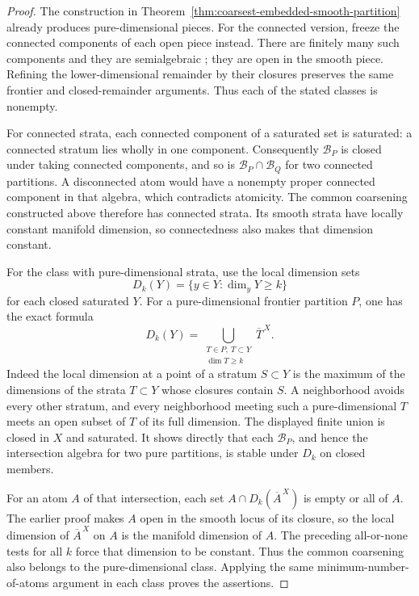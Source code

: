 \begin{proof}
The construction in
Theorem~\ref{thm:coarsest-embedded-smooth-partition} already produces
pure-dimensional pieces.  For the connected version, freeze the
connected components of each open piece instead.  There are finitely
many such components and they are semialgebraic
\cite[Proposition~1.6, p.~5]{Coste2007}; they are open in the smooth
piece.  Refining the lower-dimensional remainder by their closures
preserves the same frontier and closed-remainder arguments.
Thus each of the stated classes is nonempty.

For connected strata, each connected component of a saturated set
is saturated: a connected stratum lies wholly in one component.
Consequently $\mathcal B_P$ is closed under taking connected
components, and so is $\mathcal B_P\cap\mathcal B_Q$ for two
connected partitions.  A disconnected atom would have a nonempty
proper connected component in that algebra, which contradicts
atomicity.  The common coarsening constructed above therefore has
connected strata.  Its smooth strata have locally constant manifold
dimension, so connectedness also makes that dimension constant.

For the class with pure-dimensional strata, use the local dimension sets
\[
 D_k(Y)=\{y\in Y:\dim_yY\ge k\}
\]
for each closed saturated $Y$.  For a pure-dimensional frontier
partition $P$, one has the exact formula
\[
 D_k(Y)=
 \bigcup_{\substack{T\in P,\ T\subset Y\\\dim T\ge k}}
       \overline T^{\,X}.
\]
Indeed the local dimension at a point of a stratum $S\subset Y$
is the maximum of the dimensions of the strata $T\subset Y$ whose
closures contain $S$.  A neighborhood avoids every other stratum,
and every neighborhood meeting such a pure-dimensional $T$ meets
an open subset of $T$ of its full dimension.  The displayed finite
union is closed in $X$ and saturated.  It shows directly that each
$\mathcal B_P$, and hence the intersection algebra for two pure
partitions, is stable under $D_k$ on closed members.

For an atom $A$ of that intersection, each set
$A\cap D_k(\overline A^{\,X})$ is empty or all of $A$.
The earlier proof makes $A$ open in the smooth locus of its closure,
so the local dimension of $\overline A^{\,X}$ on $A$ is the
manifold dimension of $A$.  The preceding all-or-none tests for all
$k$ force that dimension to be constant.  Thus the common coarsening
also belongs to the pure-dimensional class.  Applying the same
minimum-number-of-atoms argument in each class proves the assertions.
\end{proof}

